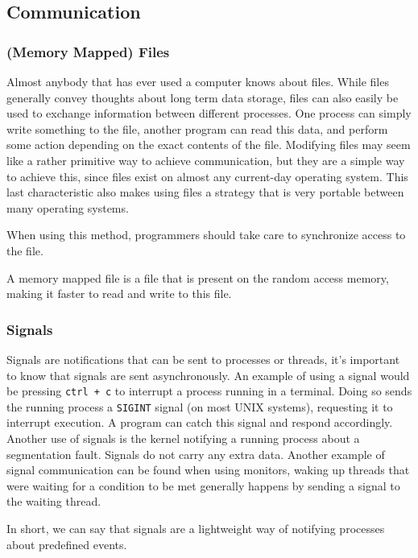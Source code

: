 
\subsection{Communication}

\subsubsection{(Memory Mapped) Files}
\label{sec:file}
Almost anybody that has ever used a computer knows about files. While files generally convey thoughts about long term data storage, files can also easily be used to exchange information between different processes. One process can simply write something to the file, another program can read this data, and perform some action depending on the exact contents of the file. Modifying files may seem like a rather primitive way to achieve communication, but they are a simple way to achieve this, since files exist on almost any current-day operating system. This last characteristic also makes using files a strategy that is very portable between many operating systems. 

When using this method, programmers should take care to synchronize access to the file.

A memory mapped file is a file that is present on the random access memory, making it faster to read and write to this file.

\subsubsection{Signals}
Signals are notifications that can be sent to processes or threads, it's important to know that signals are sent asynchronously. An example of using a signal would be pressing \verb|ctrl + c| to interrupt a process running in a terminal. Doing so sends the running process a \verb|SIGINT| signal (on most UNIX systems), requesting it to interrupt execution. A program can catch this signal and respond accordingly. 
Another use of signals is the kernel notifying a running process about a segmentation fault. Signals do not carry any extra data. Another example of signal communication can be found when using monitors, waking up threads that were waiting for a condition to be met generally happens by sending a signal to the waiting thread.

In short, we can say that signals are a lightweight way of notifying processes about predefined events. 

